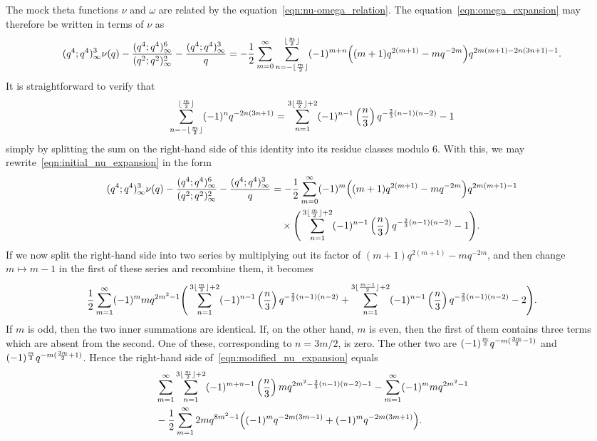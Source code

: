 \documentclass[11pt,reqno]{amsart}
\renewcommand{\=}{\;=\;}
\theoremstyle{myremark}
\begin{document}
The mock theta functions $\nu$ and $\omega$ are related by the equation~\eqref{eqn:nu-omega_relation}.
The equation~\eqref{eqn:omega_expansion} may therefore be written in terms of $\nu$ as
{\fontsize{10}{11}\selectfont
\begin{equation} \label{eqn:initial_nu_expansion}
(q^4;q^4)_\infty^3 \nu(q) - {(q^4;q^4)_\infty^6 \over (q^2;q^2)_\infty^2} - {(q^4;q^4)_\infty^3 \over q} = -{1 \over 2}\sum_{m=0}^\infty \sum_{n=-\lfloor{m \over 2}\rfloor}^{\lfloor{m \over 2}\rfloor} (-1)^{m+n} \Big( (m+1)q^{2(m+1)}-mq^{-2m}\Big) q^{2m(m+1) - 2n(3n+1)-1}.
\end{equation}
}
It is straightforward to verify that
\[ \sum_{n=-\lfloor{m \over 2}\rfloor}^{\lfloor{m \over 2}\rfloor} (-1)^n q^{-2n(3n+1)} = \sum_{n=1}^{3\lfloor {m \over 2} \rfloor + 2} (-1)^{n-1} \left({n \over 3} \right) q^{-{2 \over 3}(n-1)(n-2)} - 1 \]
simply by splitting the sum on the right-hand side of this identity into its residue classes modulo $6$. With this, we may rewrite~\eqref{eqn:initial_nu_expansion} in the form
\begin{align}
(q^4;q^4)_\infty^3 \nu(q) - {(q^4;q^4)_\infty^6 \over (q^2;q^2)_\infty^2} - {(q^4;q^4)_\infty^3 \over q} &= -{1 \over 2}\sum_{m=0}^\infty (-1)^m \Big( (m+1)q^{2(m+1)}-mq^{-2m}\Big) q^{2m(m+1)-1} \label{eqn:modified_nu_expansion} \\
&\quad \times \Bigg( \sum_{n=1}^{3\lfloor {m \over 2} \rfloor + 2} (-1)^{n-1} \left({n \over 3} \right) q^{-{2 \over 3}(n-1)(n-2)} - 1 \Bigg). \nonumber
\end{align}
If we now split the right-hand side into two series by multiplying out its factor of $(m+1)q^{2(m+1)}-mq^{-2m}$, and then change $m \mapsto m-1$ in the first of these series and recombine them, it becomes
\[ {1 \over 2}\sum_{m=1}^\infty (-1)^m m q^{2m^2-1}\Bigg( \sum_{n=1}^{3\lfloor {m \over 2} \rfloor + 2} (-1)^{n-1} \left({n \over 3} \right) q^{-{2 \over 3}(n-1)(n-2)} + \sum_{n=1}^{3\lfloor {m-1 \over 2} \rfloor + 2} (-1)^{n-1} \left({n \over 3} \right) q^{-{2 \over 3}(n-1)(n-2)} - 2 \Bigg). \]
If $m$ is odd, then the two inner summations are identical. If, on the other hand, $m$ is even, then the first of them contains three terms which are absent from the second. One of these, corresponding to $n=3m/2$, is zero. The other two are $(-1)^{m \over 2} q^{-m({3m \over 2}-1)}$ and $(-1)^{m \over 2} q^{-m({3m \over 2} + 1)}$. Hence the right-hand side of~\eqref{eqn:modified_nu_expansion} equals
\begin{align*}
&\sum_{m=1}^\infty \sum_{n=1}^{3\lfloor {m \over 2} \rfloor + 2} (-1)^{m+n-1} \left({n \over 3} \right) m q^{2m^2-{2 \over 3}(n-1)(n-2)-1} - \sum_{m=1}^\infty (-1)^m m q^{2m^2-1} \\
&- {1 \over 2}\sum_{m=1}^\infty 2m q^{8m^2-1} \Big( (-1)^{m} q^{-2m(3m-1)} + (-1)^{m} q^{-2m(3m+1)} \Big).
\end{align*}
\end{document}
